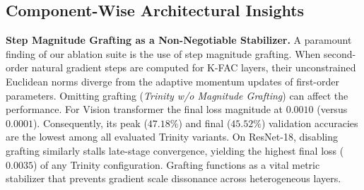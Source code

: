 \documentclass[conference]{IEEEtran}
\begin{document}
\begin{table}[htbp]
\centering
\caption{Systematic Component Ablation Study Across 200 Epochs (CIFAR-10 LT $\text{IF}=0.01$). Format: \textbf{Peak Val.\% / Final Val.\% / Final Loss}}
\label{tab:ablation_comparison}
\setlength{\tabcolsep}{2.5pt}
\end{table}

\subsection{Component-Wise Architectural Insights}

\textbf{Step Magnitude Grafting as a Non-Negotiable Stabilizer.}
A paramount finding of our ablation suite is the use of step magnitude grafting. When second-order natural gradient steps are computed for K-FAC layers, their unconstrained Euclidean norms diverge from the adaptive momentum updates of first-order parameters. Omitting grafting (\textit{Trinity w/o Magnitude Grafting}) can affect the performance. For Vision transformer the final loss magnitude at $0.0010$ (versus $0.0001$). Consequently, its peak ($47.18\%$) and final ($45.52\%$) validation accuracies are the lowest among all evaluated Trinity variants. On ResNet-18, disabling grafting similarly stalls late-stage convergence, yielding the highest final loss ($0.0035$) of any Trinity configuration. Grafting functions as a vital metric stabilizer that prevents gradient scale dissonance across heterogeneous layers.
\end{document}
